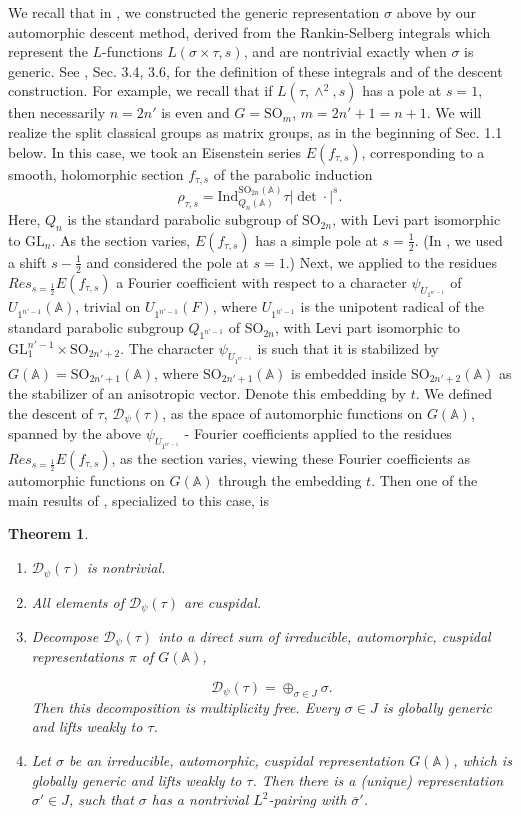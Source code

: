 \documentclass[12pts]{amsart}
\newcommand{\BA}{{\mathbb {A}}}
\newcommand{\GL}{{\mathrm{GL}}}
\newcommand{\Ind}{{\mathrm{Ind}}}
\newcommand{\SO}{{\mathrm{SO}}}
\newtheorem{thm}{Theorem}[section]
\begin{document}
We recall that in \cite{GRS11}, we constructed the generic representation $\sigma$ above by our automorphic descent method, derived from the Rankin-Selberg integrals which represent the $L$-functions $L(\sigma\times\tau,s)$, and are nontrivial exactly when $\sigma$ is generic. See \cite{GRS11}, Sec. 3.4, 3.6, for the definition of these integrals and of the descent construction. For example, we recall that if $L(\tau,\wedge^2,s)$ has a pole at $s=1$, then necessarily $n=2n'$ is even and $G=\SO_m$, $m=2n'+1=n+1$. We will realize the split classical groups as matrix groups, as in the beginning of Sec. 1.1 below. In this case, we took an Eisenstein series $E(f_{\tau,s})$, corresponding to a smooth, holomorphic section $f_{\tau,s}$ of the parabolic induction
$$
\rho_{\tau,s}=\Ind_{Q_n(\BA)}^{\SO_{2n}(\BA)}\tau|\det\cdot|^s.
$$
Here, $Q_n$ is the standard parabolic subgroup of $\SO_{2n}$, with Levi part isomorphic to $\GL_n$. As the section varies, $E(f_{\tau,s})$ has a simple pole at $s=\frac{1}{2}$. (In \cite{GRS11}, we used a shift $s-\frac{1}{2}$ and considered the pole at $s=1$.) Next, we applied to the residues $Res_{s=\frac{1}{2}}E(f_{\tau,s})$ a Fourier coefficient with respect to a character $\psi_{U_{1^{n'-1}}}$ of $U_{1^{n'-1}}(\BA)$, trivial on $U_{1^{n'-1}}(F)$, where $U_{1^{n'-1}}$ is the unipotent radical of the standard parabolic subgroup $Q_{1^{n'-1}}$ of  $\SO_{2n}$, with Levi part isomorphic to $\GL_1^{n'-1}\times \SO_{2n'+2}$. The character $\psi_{U_{1^{n'-1}}}$ is such that it is stabilized by $G(\BA)=\SO_{2n'+1}(\BA)$, where $\SO_{2n'+1}(\BA)$ is embedded inside $\SO_{2n'+2}(\BA)$ as the stabilizer of an anisotropic vector. Denote this embedding by $t$. We defined the descent of $\tau$, $\mathcal{D}_\psi(\tau)$, as the space of automorphic functions on $G(\BA)$, spanned by the above $\psi_{U_{1^{n'-1}}}$ - Fourier coefficients applied to the residues $Res_{s=\frac{1}{2}}E(f_{\tau,s})$, as the section varies, viewing these Fourier coefficients as automorphic functions on $G(\BA)$ through the embedding $t$. Then one of the main results of \cite{GRS11}, specialized to this case, is
\begin{thm}\label{thm 0.1}
	\begin{enumerate}
		\item $\mathcal{D}_\psi(\tau)$ is nontrivial.
		\item All elements of $\mathcal{D}_\psi(\tau)$ are cuspidal.
		\item Decompose $\mathcal{D}_\psi(\tau)$ into a direct sum of irreducible, automorphic, cuspidal representations $\pi$ of $G(\BA)$,
		 
		$$
		\mathcal{D}_\psi(\tau)=\oplus_{\sigma\in J} \sigma.
		$$
		Then this decomposition is multiplicity free. Every $\sigma\in J$ is globally generic and lifts weakly to $\tau$.
		\item Let $\sigma$ be an irreducible, automorphic, cuspidal representation  $G(\BA)$, which is globally generic and lifts weakly to $\tau$. Then there is a (unique) representation $\sigma'\in J$, such that $\sigma$ has a nontrivial $L^2$-pairing with $\bar{\sigma}'$.
\end{enumerate}
\end{thm} 
\end{document}
